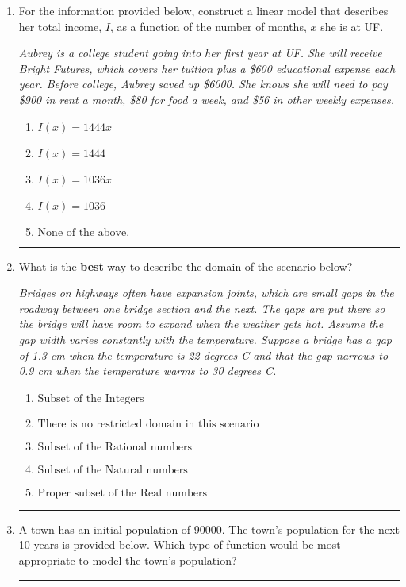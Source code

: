 \documentclass[14pt]{extbook}
\newcommand{\litem}[1]{\item#1\hspace*{-1cm}\rule{\textwidth}{0.4pt}}
\begin{document}
\begin{enumerate}
{\begin{enumerate}[label=\Alph*.]
\end{enumerate} }
\litem{
For the information provided below, construct a linear model that describes her total income, $I$, as a function of the number of months, $x$ she is at UF.
\begin{center}
    \textit{ Aubrey is a college student going into her first year at UF. She will receive Bright Futures, which covers her tuition plus a \$600 educational expense each year. Before college, Aubrey saved up \$6000. She knows she will need to pay \$900 in rent a month, \$80 for food a week, and \$56 in other weekly expenses. }
\end{center}
\begin{enumerate}[label=\Alph*.]
\item \( I(x) = 1444 x \)
\item \( I(x) = 1444 \)
\item \( I(x) = 1036 x \)
\item \( I(x) = 1036 \)
\item \( \text{None of the above.} \)

\end{enumerate} }
\litem{
What is the \textbf{best} way to describe the domain of the scenario below?
\begin{center}
    \textit{ Bridges on highways often have expansion joints, which are small gaps in the roadway between one bridge section and the next. The gaps are put there so the bridge will have room to expand when the weather gets hot. Assume the gap width varies constantly with the temperature. Suppose a bridge has a gap of 1.3 cm when the temperature is 22 degrees C and that the gap narrows to 0.9 cm when the temperature warms to 30 degrees C. }
\end{center}
\begin{enumerate}[label=\Alph*.]
\item \( \text{Subset of the Integers} \)
\item \( \text{There is no restricted domain in this scenario} \)
\item \( \text{Subset of the Rational numbers} \)
\item \( \text{Subset of the Natural numbers} \)
\item \( \text{Proper subset of the Real numbers} \)

\end{enumerate} }
\litem{
A town has an initial population of 90000. The town's population for the next 10 years is provided below. Which type of function would be most appropriate to model the town's population?


}
\end{enumerate}
\end{document}
